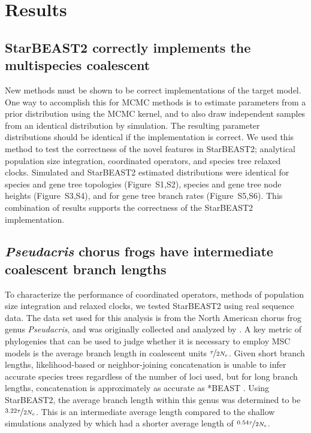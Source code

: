 \documentclass[12pt]{article}
\begin{document}
\section{Results}

\subsection{StarBEAST2 correctly implements the multispecies coalescent}

New methods must be shown to be correct implementations of the
target model. One way to accomplish this for MCMC methods is to estimate
parameters from a prior distribution using the MCMC kernel, and to also draw
independent samples from an identical distribution by simulation. The resulting
parameter distributions should be identical if the implementation is correct. We
used this method to test the correctness of the novel features in StarBEAST2;
analytical population size integration, coordinated operators, and species tree
relaxed clocks. Simulated and StarBEAST2 estimated distributions were identical
for species and gene tree topologies (Figure~S1,S2), species and gene tree node
heights (Figure~S3,S4), and for gene tree branch rates (Figure~S5,S6). This
combination of results supports the correctness of the StarBEAST2
implementation.

\subsection{\textit{Pseudacris} chorus frogs have intermediate coalescent branch lengths}

To characterize the performance of coordinated operators, methods of population size
integration and relaxed clocks, we tested StarBEAST2 using real sequence data.
The data set used for this analysis is from the North American chorus frog genus
\textit{Pseudacris}, and was originally collected and analyzed by
\cite{Barrow201478}. A key metric of phylogenies that can be used to judge
whether it is necessary to employ MSC models is the average
branch length in coalescent units $\nicefrac{\tau}{2N_e}$. Given short branch
lengths, likelihood-based or neighbor-joining concatenation is unable to infer accurate species trees regardless of
the number of loci used, but for long branch lengths, concatenation is
approximately as accurate as *BEAST \citep{Ogilvie01052016}. Using StarBEAST2,
the average branch length within this genus was determined to be
$\nicefrac{3.22\tau}{2N_e}$. This is an intermediate average length compared to
the shallow simulations analyzed by \cite{Ogilvie01052016} which had a shorter
average length of $\nicefrac{0.54\tau}{2N_e}$.
\end{document}
